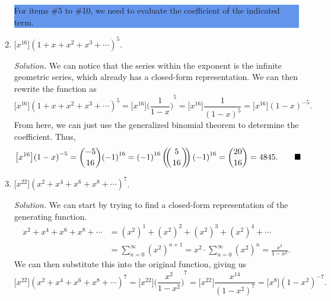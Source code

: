 \documentclass{article}
\newcommand{\multibinom}[2]{
  \left(\!\!\middle(\genfrac{}{}{0pt}{}{#1}{#2}\middle)\!\!\right)} %
\begin{document}
\begin{enumerate}
    \par
    \colorbox{CornflowerBlue}{
    \begin{minipage}[c]{0.9\textwidth}
        \centering
        For items \#5 to \#10, we need to evaluate the coefficient of the indicated term. 
    \end{minipage}
    }
    \item $\big[x^{16}\big]{(1+x+x^2+x^3+\cdots)}^5$.\par
        \textit{Solution.} We can notice that the series within the exponent is the infinite geometric series, which already has a closed-form representation. We can then rewrite the 
        function as\[
            \big[x^{16}\big]{(1+x+x^2+x^3+\cdots)}^5 = \big[x^{16}\big]{\bigg(\frac{1}{1-x}\bigg)}^5 = \big[x^{16}\big]\frac{1}{{(1-x)}^5} = \big[x^{16}\big] {(1-x)}^{-5}. 
        \] From here, we can just use the generalized binomial theorem to determine the coefficient. Thus,\[ 
            \big[x^{16}\big] {(1-x)}^{-5} = \binom{-5}{16} {(-1)}^{16} = {(-1)}^{16} \multibinom{5}{16} {(-1)}^{16} = \binom{20}{16} = 4845. \tag*{$\blacksquare$} 
        \]
    \item $\big[x^{22}\big]{(x^2+ x^4 + x^6 + x^8 +\cdots)}^7$.\par
        \textit{Solution.} We can start by trying to find a closed-form representation of the generating function.\begin{align*} 
            x^2+ x^4 + x^6 + x^8 +\cdots &= {(x^2)}^1 + {(x^2)}^2 + {(x^2)}^3 + {(x^2)}^4 + \cdots \\ 
            &= \sum_{n=0}^\infty {(x^2)}^{n+1} = x^2 \cdot \sum_{n=0}^\infty {(x^2)}^n = \frac{x^2}{1-x^2}. 
        \end{align*} We can then substitute this into the original function, giving us\[
            \big[x^{22}\big]{(x^2+ x^4 + x^6 + x^8 +\cdots)}^7 = \big[x^{22}\big]{\bigg(\frac{x^2}{1-x^2}\bigg)}^7 = \big[x^{22}\big] \frac{x^{14}}{{(1-x^2)}^7} = \big[x^8\big] {(1-x^2)}^{-7}.
\]
\end{enumerate}
\end{document}
